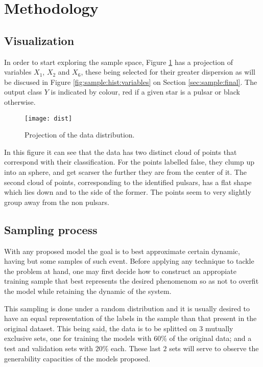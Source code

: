 \documentclass[journal]{IEEEtran}
\begin{document}

\section{Methodology\label{sec:methods}}

\subsection{Visualization}

In order to start exploring the sample space, Figure \ref{fig:dist} has a
projection of variables $X_1$, $X_2$ and $X_6$, these being selected for their
greater dispersion as will be discused in Figure \ref{fig:sample:hist:variables}
on Section \ref{sec:sample:final}. The output class $Y$ is indicated by
colour, red if a given star is a pulsar or black otherwise. 

\begin{figure}[ht]
    \texttt{[image: dist]}
    \caption{Projection of the data distribution. \label{fig:dist}}
\end{figure}

In this figure it can see that the data has two distinct cloud of points that
correspond with their classification. For the points labelled false, they clump
up into an sphere, and get scarser the further they are from the center of it.
The second cloud of points, corresponding to the identified pulsars, has a flat
shape which lies down and to the side of the former. The points seem to very
slightly group away from the non pulsars.

\subsection{Sampling process\label{sec:sample}}

With any proposed model the goal is to best approximate certain dynamic, having
but some samples of such event. Before applying any technique to tackle the
problem at hand, one may first decide how to construct an appropiate training
sample that best represents the desired phenomenom so as not to overfit the
model while retaining the dynamic of the system.

This sampling is done under a random distribution and it is usually desired to
have an equal representation of the labels in the sample than that present in
the original dataset. This being said, the data is to be splitted on $3$
mutually exclusive sets, one for training the models with $60\%$ of the original
data; and a test and validation sets with $20\%$ each. These last $2$ sets will
serve to observe the generability capacities of the models proposed.
\end{document}
